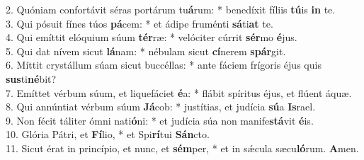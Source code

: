2. Quóniam confortávit séras portárum tu\textbf{á}rum: * benedíxit fíliis \textbf{tú}is \textbf{in} te.\\
3. Qui pósuit fínes túos \textbf{pá}cem: * et ádipe fruménti \textbf{sá}ti\textbf{at} te.\\
4. Qui emíttit elóquium súum \textbf{tér}ræ: * velóciter cúrrit \textbf{sér}mo \textbf{é}jus.\\
5. Qui dat nívem sicut \textbf{lá}nam: * nébulam sicut \textbf{cí}nerem \textbf{spár}git.\\
6. Míttit crystállum súam sicut buccéllas: * ante fáciem frígoris éjus quis \textbf{sus}ti\textbf{né}bit?\\
7. Emíttet vérbum súum, et liquefáciet \textbf{é}a: * flábit spíritus éjus, et flúent áquæ.\\
8. Qui annúntiat vérbum súum \textbf{Já}cob: * justítias, et judícia \textbf{sú}a \textbf{Is}rael.\\
9. Non fécit táliter ómni nati\textbf{ó}ni: * et judícia súa non manife\textbf{stá}vit \textbf{é}is.\\
10. Glória Pátri, et \textbf{Fí}lio, * et Spi\textbf{rí}tui \textbf{Sán}cto.\\
11. Sicut érat in princípio, et nunc, et \textbf{sém}per, * et in sǽcula sæcu\textbf{ló}rum. \textbf{ A}men.